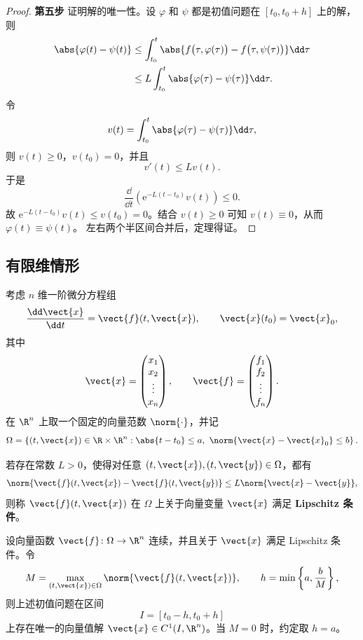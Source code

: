 \begin{proof}
	\noindent\textbf{第五步}\quad
	证明解的唯一性。设 $\varphi$ 和 $\psi$ 都是初值问题在
	$[t_0,t_0+h]$ 上的解，则
	\[
		\begin{aligned}
			\abs{\varphi(t)-\psi(t)}
			&\leq\int_{t_0}^{t}
			\abs{
				f\bigl(\tau,\varphi(\tau)\bigr)
				-f\bigl(\tau,\psi(\tau)\bigr)
			}\dd\tau\\
			&\leq L\int_{t_0}^{t}
			\abs{\varphi(\tau)-\psi(\tau)}\dd\tau.
		\end{aligned}
	\]
	令
	\[
		v(t)=\int_{t_0}^{t}
		\abs{\varphi(\tau)-\psi(\tau)}\dd\tau,
	\]
	则 $v(t)\geq0$，$v(t_0)=0$，并且
	\[
		v'(t)\leq Lv(t).
	\]
	于是
	\[
		\dfrac{\dd}{\dd t}
		\left(\mathrm{e}^{-L(t-t_0)}v(t)\right)\leq0.
	\]
	故 $\mathrm{e}^{-L(t-t_0)}v(t)\leq v(t_0)=0$。结合 $v(t)\geq0$
	可知 $v(t)\equiv0$，从而 $\varphi(t)\equiv\psi(t)$。
	左右两个半区间合并后，定理得证。
\end{proof}


\subsection*{有限维情形}

考虑 $n$ 维一阶微分方程组
\[
	\dfrac{\dd\vect{x}}{\dd t}
	=\vect{f}(t,\vect{x}),
	\qquad
	\vect{x}(t_0)=\vect{x}_0,
\]
其中
\[
	\vect{x}
	=\begin{pmatrix}
		x_1\\
		x_2\\
		\vdots\\
		x_n
	\end{pmatrix},
	\qquad
	\vect{f}
	=\begin{pmatrix}
		f_1\\
		f_2\\
		\vdots\\
		f_n
	\end{pmatrix}.
\]
在 $\R^n$ 上取一个固定的向量范数 $\norm{\cdot}$，并记
\[
	\Omega
	=\left\{
		(t,\vect{x})\in\R\times\R^n:
		\abs{t-t_0}\leq a,\ 
		\norm{\vect{x}-\vect{x}_0}\leq b
	\right\}.
\]

\begin{definition}\label{def:向量函数的Lipschitz条件}
	若存在常数 $L>0$，使得对任意
	$(t,\vect{x}),(t,\vect{y})\in\Omega$，都有
	\[
		\norm{
			\vect{f}(t,\vect{x})
			-\vect{f}(t,\vect{y})
		}
		\leq
		L\norm{\vect{x}-\vect{y}},
	\]
	则称 $\vect{f}(t,\vect{x})$ 在 $\Omega$ 上关于向量变量
	$\vect{x}$ 满足 \textbf{Lipschitz 条件}。
\end{definition}

\begin{theorem}
	\label{thm:有限维Picard存在唯一性定理}
	设向量函数
	$\vect{f}\colon\Omega\to\R^n$ 连续，并且关于 $\vect{x}$
	满足 Lipschitz 条件。令
	\[
		M=\max_{(t,\vect{x})\in\Omega}
		\norm{\vect{f}(t,\vect{x})},
		\qquad
		h=\min\left\{a,\dfrac{b}{M}\right\},
	\]
	则上述初值问题在区间
	\[
		I=[t_0-h,t_0+h]
	\]
	上存在唯一的向量值解
	$\vect{x}\in C^1(I,\R^n)$。当 $M=0$ 时，约定取 $h=a$。
\end{theorem}

